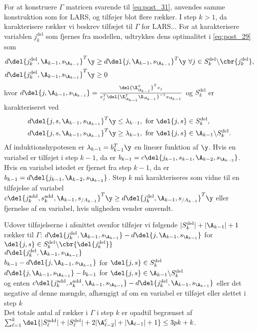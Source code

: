 For at konstruere \(\Gamma\) matricen svarende til \eqref{eq:post_31}, anvendes samme konstruktion som for LARS, og tilføjer blot flere rækker.
I step \(k>1\), da karakterisere rækker vi beskrev tilfæjet til \(\Gamma\) for LARS...
For at karakterisere variablen \(j_k^\text{del}\) som fjernes fra modellen, udtrykkes dens optimalitet i \eqref{eq:post_29} som
\begin{align*}
d \del{j_k^\text{del}, \A_{k-1}, s_{\A_{k-1}}}^T \y &\geq d \del{j, \A_{k-1}, s_{\A_{k-1}}}^T \y \ \forall j \in S_k^\text{del} \backslash \cbr{j_k^\text{del}}, \\
d \del{j_k^\text{del}, \A_{k-1}, s_{\A_{k-1}}}^T \y &\geq 0
\end{align*}
hvor \(d \del{j, \A_{k-1}, s_{\A_{k-1}}} = \frac{\del{\X_{\A_{k-1}}^+}^T e_j}{e_j^T \del{\X_{\A_{k-1}}^T \X_{\A_{k-1}}}^{-1} s_{\A_{k-1}}}\) og \(S_k^\text{del}\) er karakteriseret ved
\begin{align*}
d \del{j, s, \A_{k-1}, s_{\A_{k-1}}}^T \y &\leq \lambda_{k-1}, \ \text{for } \del{j,s} \in S_k^\text{del}, \\
d \del{j, s, \A_{k-1}, s_{\A_{k-1}}}^T \y &\geq \lambda_{k-1}, \ \text{for } \del{j,s} \in \A_{k-1} \backslash S_k^\text{del}.
\end{align*}
Af induktionshypotesen er \(\lambda_{k-1}=b^T_{k-1} \y\) en lineær funktion af \(\y\).
Hvis en variabel er tilføjet i step \(k-1\), da er \(b_{k-1}=c \del{j_{k-1}, s_{k-1},\A_{k-2}, s_{\A_{k-2}}}\).
Hvis en variabel istedet er fjernet fra step \(k-1\), da er \(b_{k-1}=d \del{j_{k-1}, \A_{k-2}, s_{\A_{k-2}}}\).
Step \(k\) må karakteriseres som vidne til en tilføjelse af variabel \(c \del{j_k^\text{add}, s_k^\text{add}, \A_{k-1}, s_{/A_{k-1}}}^T \y \geq d \del{j_k^\text{del}, \A_{k-1}, s_{/A_{k-1}}}^T \y\) eller fjernelse af en variabel, hvis uligheden vender omvendt.


Udover tilføjelserne i afsnittet ovenfor tilføjer vi følgende \(\vert S_k^\text{del} \vert + \vert \A_{k-1} \vert + 1\) rækker til \(\Gamma\):
\(d \del{j_k^\text{del}, \A_{k-1}, s_{\A_{k-1}}} - d \del{j, \A_{k-1}, s_{\A_{k-1}}}\) for \(\del{j,s} \in S_k^\text{del} \backslash \cbr{\del{j_k^\text{del}}}\) \\
\(d \del{j_k^\text{del}, \A_{k-1}, s_{\A_{k-1}}}\) \\
\(b_{k-1} - d \del{j, \A_{k-1}, s_{\A_{k-1}}}\) for \(\del{j,s} \in S_k^\text{del}\) \\
\(d \del{j, \A_{k-1}, s_{\A_{k-1}}} - b_{k-1}\) for \(\del{j,s} \in \A_{k-1} \backslash S_k^\text{del}\) \\
og enten \(c \del{j_k^\text{add}, s_k^\text{add}, \A_{k-1}, s_{\A_{k-1}}} - d \del{j_k^\text{del}, \A_{k-1}, s_{\A_{k-1}}}\) eller det negative af denne mængde, afhængigt af om en variabel er tilføjet eller slettet i step \(k\) \\
Det totale antal af rækker i \(\Gamma\) i step \(k\) er opadtil begrænset af \(\sum_{\ell=1}^k \del{\vert S_\ell^\text{add} \vert + \vert S_\ell^\text{del} \vert + 2 \vert \A_{\ell-2}^c \vert + \vert \A_{\ell-1} \vert + 1} \leq 3 pk + k\).